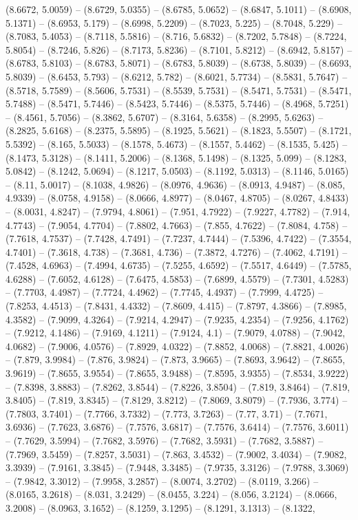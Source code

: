 (8.6672, 5.0059) -- (8.6729, 5.0355) -- (8.6785, 5.0652) -- (8.6847, 5.1011) -- (8.6908, 5.1371) -- (8.6953, 5.179) -- (8.6998, 5.2209) -- (8.7023, 5.225) -- (8.7048, 5.229) -- (8.7083, 5.4053) -- (8.7118, 5.5816) -- (8.716, 5.6832) -- (8.7202, 5.7848) -- (8.7224, 5.8054) -- (8.7246, 5.826) -- (8.7173, 5.8236) -- (8.7101, 5.8212) -- (8.6942, 5.8157) -- (8.6783, 5.8103) -- (8.6783, 5.8071) -- (8.6783, 5.8039) -- (8.6738, 5.8039) -- (8.6693, 5.8039) -- (8.6453, 5.793) -- (8.6212, 5.782) -- (8.6021, 5.7734) -- (8.5831, 5.7647) -- (8.5718, 5.7589) -- (8.5606, 5.7531) -- (8.5539, 5.7531) -- (8.5471, 5.7531) -- (8.5471, 5.7488) -- (8.5471, 5.7446) -- (8.5423, 5.7446) -- (8.5375, 5.7446) -- (8.4968, 5.7251) -- (8.4561, 5.7056) -- (8.3862, 5.6707) -- (8.3164, 5.6358) -- (8.2995, 5.6263) -- (8.2825, 5.6168) -- (8.2375, 5.5895) -- (8.1925, 5.5621) -- (8.1823, 5.5507) -- (8.1721, 5.5392) -- (8.165, 5.5033) -- (8.1578, 5.4673) -- (8.1557, 5.4462) -- (8.1535, 5.425) -- (8.1473, 5.3128) -- (8.1411, 5.2006) -- (8.1368, 5.1498) -- (8.1325, 5.099) -- (8.1283, 5.0842) -- (8.1242, 5.0694) -- (8.1217, 5.0503) -- (8.1192, 5.0313) -- (8.1146, 5.0165) -- (8.11, 5.0017) -- (8.1038, 4.9826) -- (8.0976, 4.9636) -- (8.0913, 4.9487) -- (8.085, 4.9339) -- (8.0758, 4.9158) -- (8.0666, 4.8977) -- (8.0467, 4.8705) -- (8.0267, 4.8433) -- (8.0031, 4.8247) -- (7.9794, 4.8061) -- (7.951, 4.7922) -- (7.9227, 4.7782) -- (7.914, 4.7743) -- (7.9054, 4.7704) -- (7.8802, 4.7663) -- (7.855, 4.7622) -- (7.8084, 4.758) -- (7.7618, 4.7537) -- (7.7428, 4.7491) -- (7.7237, 4.7444) -- (7.5396, 4.7422) -- (7.3554, 4.7401) -- (7.3618, 4.738) -- (7.3681, 4.736) -- (7.3872, 4.7276) -- (7.4062, 4.7191) -- (7.4528, 4.6963) -- (7.4994, 4.6735) -- (7.5255, 4.6592) -- (7.5517, 4.6449) -- (7.5785, 4.6288) -- (7.6052, 4.6128) -- (7.6475, 4.5853) -- (7.6899, 4.5579) -- (7.7301, 4.5283) -- (7.7703, 4.4987) -- (7.7724, 4.4962) -- (7.7745, 4.4937) -- (7.7999, 4.4725) -- (7.8253, 4.4513) -- (7.8431, 4.4332) -- (7.8609, 4.415) -- (7.8797, 4.3866) -- (7.8985, 4.3582) -- (7.9099, 4.3264) -- (7.9214, 4.2947) -- (7.9235, 4.2354) -- (7.9256, 4.1762) -- (7.9212, 4.1486) -- (7.9169, 4.1211) -- (7.9124, 4.1) -- (7.9079, 4.0788) -- (7.9042, 4.0682) -- (7.9006, 4.0576) -- (7.8929, 4.0322) -- (7.8852, 4.0068) -- (7.8821, 4.0026) -- (7.879, 3.9984) -- (7.876, 3.9824) -- (7.873, 3.9665) -- (7.8693, 3.9642) -- (7.8655, 3.9619) -- (7.8655, 3.9554) -- (7.8655, 3.9488) -- (7.8595, 3.9355) -- (7.8534, 3.9222) -- (7.8398, 3.8883) -- (7.8262, 3.8544) -- (7.8226, 3.8504) -- (7.819, 3.8464) -- (7.819, 3.8405) -- (7.819, 3.8345) -- (7.8129, 3.8212) -- (7.8069, 3.8079) -- (7.7936, 3.774) -- (7.7803, 3.7401) -- (7.7766, 3.7332) -- (7.773, 3.7263) -- (7.77, 3.71) -- (7.7671, 3.6936) -- (7.7623, 3.6876) -- (7.7576, 3.6817) -- (7.7576, 3.6414) -- (7.7576, 3.6011) -- (7.7629, 3.5994) -- (7.7682, 3.5976) -- (7.7682, 3.5931) -- (7.7682, 3.5887) -- (7.7969, 3.5459) -- (7.8257, 3.5031) -- (7.863, 3.4532) -- (7.9002, 3.4034) -- (7.9082, 3.3939) -- (7.9161, 3.3845) -- (7.9448, 3.3485) -- (7.9735, 3.3126) -- (7.9788, 3.3069) -- (7.9842, 3.3012) -- (7.9958, 3.2857) -- (8.0074, 3.2702) -- (8.0119, 3.266) -- (8.0165, 3.2618) -- (8.031, 3.2429) -- (8.0455, 3.224) -- (8.056, 3.2124) -- (8.0666, 3.2008) -- (8.0963, 3.1652) -- (8.1259, 3.1295) -- (8.1291, 3.1313) -- (8.1322, 